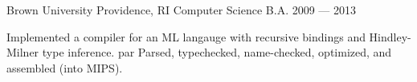 \documentclass [11pt] {resume}
\begin{document}
\makecvheader[C]



  \begin{cventries}



      \begin{cventries}
        \cventry
        {Brown University}
        {Providence, RI}
        {Computer Science B.A.}
        {2009 — 2013}
        {\item {Implemented a compiler for an ML langauge with recursive bindings and Hindley-Milner type inference. par Parsed, typechecked, name-checked, optimized, and assembled (into MIPS).}}
      \end{cventries}



  \end{cventries}


\end{document}
